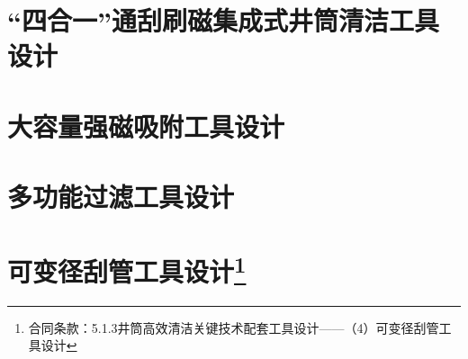\documentclass[12pt, a4paper, zihao=-4, openright]{ctexrep}
\begin{document}
\section{“四合一”通刮刷磁集成式井筒清洁工具设计}
	
	
\section{大容量强磁吸附工具设计}
	
\section{多功能过滤工具设计}
	
\section[可变径刮管工具设计]{可变径刮管工具设计\protect\footnote{合同条款：5.1.3井筒高效清洁关键技术配套工具设计——（4）可变径刮管工具设计}}
	
	

	
\end{document}
